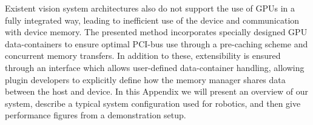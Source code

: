 Existent vision system architectures also do not support the use of GPUs in a fully integrated way, leading to inefficient use of the device and communication with device memory. The presented method incorporates specially designed GPU data-containers to ensure optimal PCI-bus use through a pre-caching scheme and concurrent memory transfers. In addition to these, extensibility is ensured through an interface which allows user-defined data-container handling, allowing plugin developers to explicitly define how the memory manager shares data between the host and device. In this Appendix we will present an overview of our system, describe a typical system configuration used for robotics, and then give performance figures from a demonstration setup.


